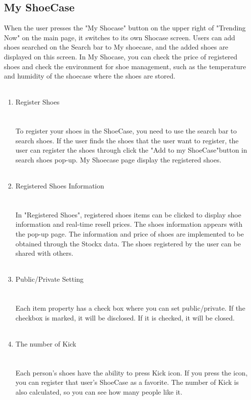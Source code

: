 \documentclass[conference]{IEEEtran}
\begin{document}
\subsection{My ShoeCase}
When the user presses the "My Shocase" button on the upper right of "Trending Now" on the main page, it switches to its own Shocase screen. Users can add shoes searched on the Search bar to My shoecase, and the added shoes are displayed on this screen. In My Shocase, you can check the price of registered shoes and check the environment for shoe management, such as the temperature and humidity of the shoecase where the shoes are stored.\\\\
\begin{enumerate}
	\item Register Shoes\\\\
\\To register your shoes in the ShoeCase, you need to use the search bar to search shoes. If the user finds the shoes that the user want to register, the user can register the shoes through click the "Add to my ShoeCase"button in search shoes pop-up. My Shoecase page display the registered shoes.\\\\
	
	\item Registered Shoes Information\\\\
\\In "Registered Shoes", registered shoes items can be clicked to display shoe information and real-time resell prices. The shoes information appears with the pop-up page.
The information and price of shoes are implemented to be obtained through the Stockx data. The shoes registered by the user can be shared with others.\\\\
	\item Public/Private Setting\\\\
\\Each item property has a check box where you can set public/private. 
If the checkbox is marked, it will be disclosed. If it is checked, it will be closed.\\\\
	\item The number of Kick\\\\
\\Each person's shoes have the ability to press Kick icon. 
If you press the icon, you can register that user's ShoeCase as a favorite.
The number of Kick is also calculated, so you can see how many people like it.\\\\
\end{enumerate}
\end{document}

